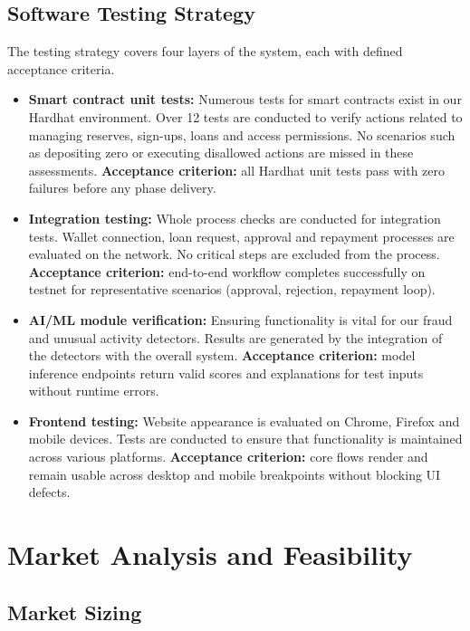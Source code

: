 \documentclass[12pt, a4paper]{report}
\begin{document}
\section{Software Testing Strategy}

The testing strategy covers four layers of the system, each with defined acceptance criteria.

\begin{itemize}[noitemsep]
\item \textbf{Smart contract unit tests:} Numerous tests for smart contracts exist in our Hardhat environment. Over 12 tests are conducted to verify actions related to managing reserves, sign-ups, loans and access permissions. No scenarios such as depositing zero or executing disallowed actions are missed in these assessments. \textbf{Acceptance criterion:} all Hardhat unit tests pass with zero failures before any phase delivery.
\item \textbf{Integration testing:} Whole process checks are conducted for integration tests. Wallet connection, loan request, approval and repayment processes are evaluated on the network. No critical steps are excluded from the process. \textbf{Acceptance criterion:} end-to-end workflow completes successfully on testnet for representative scenarios (approval, rejection, repayment loop).
\item \textbf{AI/ML module verification:} Ensuring functionality is vital for our fraud and unusual activity detectors. Results are generated by the integration of the detectors with the overall system. \textbf{Acceptance criterion:} model inference endpoints return valid scores and explanations for test inputs without runtime errors.
\item \textbf{Frontend testing:} Website appearance is evaluated on Chrome, Firefox and mobile devices. Tests are conducted to ensure that functionality is maintained across various platforms. \textbf{Acceptance criterion:} core flows render and remain usable across desktop and mobile breakpoints without blocking UI defects.
\end{itemize}

\chapter{Market Analysis and Feasibility}

\section{Market Sizing}
\end{document}

